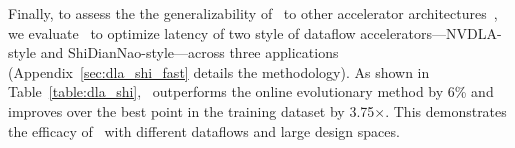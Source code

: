 \vspace{-0.1cm}
%
Finally, to assess the the generalizability of \primemethodname\ to other accelerator architectures~\citep{kao2020confuciux}, we evaluate \primemethodname\ to optimize latency of two style of dataflow accelerators---NVDLA-style and ShiDianNao-style---across three applications (Appendix~\ref{sec:dla_shi_fast} details the methodology).
%
As shown in Table~\ref{table:dla_shi}, \primemethodname\ outperforms the online evolutionary method by 6\% and improves over the best point in the training dataset by 3.75$\times$.
%
This demonstrates the efficacy of \primemethodname\ with different dataflows and large design spaces.
%

